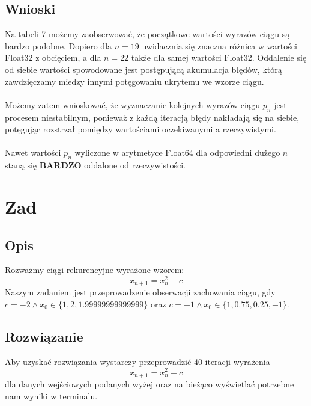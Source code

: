 \documentclass[10pt,a4paper, polish]{article}
\begin{document}
\subsection*{Wnioski}
Na tabeli 7 możemy zaobserwować, że początkowe wartości wyrazów ciągu są bardzo podobne. Dopiero dla $n = 19$ uwidacznia się znaczna różnica w wartości Float32 z obcięciem, a dla $n = 22$ także dla samej wartości Float32. Oddalenie się od siebie wartości spowodowane jest postępującą akumulacja błędów, którą zawdzięczamy miedzy innymi potęgowaniu ukrytemu we wzorze ciągu.\\\\
Możemy zatem wnioskować, że wyznaczanie kolejnych wyrazów ciągu $p_n$ jest procesem niestabilnym, ponieważ z każdą iteracją błędy nakładają się na siebie, potęgując rozstrzał pomiędzy wartościami oczekiwanymi a rzeczywistymi.\\\\
Nawet wartości $p_n$ wyliczone w arytmetyce Float64 dla odpowiedni dużego $n$ staną się \textbf{BARDZO} oddalone od rzeczywistości.
\section{Zad}
\subsection*{Opis}
Rozważmy ciągi rekurencyjne wyrażone wzorem:
$$x_{n+1} = x_n^2 + c$$
Naszym zadaniem jest przeprowadzenie obserwacji zachowania ciągu, gdy $c = -2 \wedge x_0 \in \{1, 2, 1.99999999999999\}$ oraz $c = -1 \wedge x_0 \in \{1, 0.75, 0.25, -1\}$.
\subsection*{Rozwiązanie}
Aby uzyskać rozwiązania wystarczy przeprowadzić 40 iteracji wyrażenia $$x_{n+1} = x_n^2 + c$$ dla danych wejściowych podanych wyżej oraz na bieżąco wyświetlać potrzebne nam wyniki w terminalu.
\end{document}
